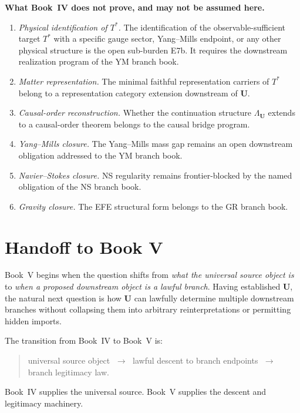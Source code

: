 \documentclass[12pt,oneside]{amsbook}
\theoremstyle{plain}
\theoremstyle{definition}
\theoremstyle{remark}
\begin{document}
\textbf{What Book~IV does not prove, and may not be assumed here.}
\begin{enumerate}
  \item \emph{Physical identification of $T^*$.}  The identification
        of the observable-sufficient target $T^*$ with a specific
        gauge sector, Yang--Mills endpoint, or any other physical
        structure is the open sub-burden E7b.  It requires the
        downstream realization program of the YM branch book.
  \item \emph{Matter representation.}  The minimal faithful
        representation carriers of $T^*$ belong to a representation
        category extension downstream of $\mathbf{U}$.
  \item \emph{Causal-order reconstruction.}  Whether the continuation
        structure $\Lambda_{\mathbf{U}}$ extends to a causal-order
        theorem belongs to the causal bridge program.
  \item \emph{Yang--Mills closure.}  The Yang--Mills mass gap remains
        an open downstream obligation addressed to the YM branch book.
  \item \emph{Navier--Stokes closure.}  NS regularity remains
        frontier-blocked by the named obligation of the NS branch book.
  \item \emph{Gravity closure.}  The EFE structural form belongs to
        the GR branch book.
\end{enumerate}

\section{Handoff to Book V}

Book~V begins when the question shifts from \emph{what the universal
source object is} to \emph{when a proposed downstream object is a
lawful branch}.  Having established $\mathbf{U}$, the natural next
question is how $\mathbf{U}$ can lawfully determine multiple
downstream branches without collapsing them into arbitrary
reinterpretations or permitting hidden imports.

The transition from Book~IV to Book~V is:
\begin{quote}
  universal source object
  $\;\longrightarrow\;$
  lawful descent to branch endpoints
  $\;\longrightarrow\;$
  branch legitimacy law.
\end{quote}
Book~IV supplies the universal source.  Book~V supplies the descent
and legitimacy machinery.
\end{document}
